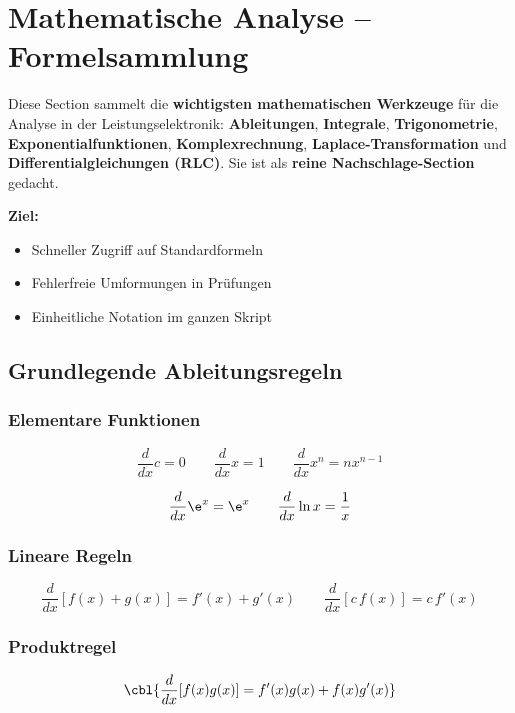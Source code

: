 \section{Mathematische Analyse -- Formelsammlung}

Diese Section sammelt die \textbf{wichtigsten mathematischen Werkzeuge}
für die Analyse in der Leistungselektronik:
\textbf{Ableitungen}, \textbf{Integrale}, \textbf{Trigonometrie},
\textbf{Exponentialfunktionen}, \textbf{Komplexrechnung},
\textbf{Laplace-Transformation} und \textbf{Differentialgleichungen (RLC)}.
Sie ist als \textbf{reine Nachschlage-Section} gedacht.

\smallskip

\textbf{Ziel:}
\begin{itemize}
    \item Schneller Zugriff auf Standardformeln
    \item Fehlerfreie Umformungen in Prüfungen
    \item Einheitliche Notation im ganzen Skript
\end{itemize}

\subsection{Grundlegende Ableitungsregeln}

\subsubsection{Elementare Funktionen}

\[
\frac{d}{dx} c = 0
\qquad
\frac{d}{dx} x = 1
\qquad
\frac{d}{dx} x^n = n x^{n-1}
\]

\[
\frac{d}{dx} \e^{x} = \e^{x}
\qquad
\frac{d}{dx} \ln x = \frac{1}{x}
\]

\subsubsection{Lineare Regeln}

\[
\frac{d}{dx} [f(x) + g(x)] = f'(x) + g'(x)
\qquad
\frac{d}{dx} [c \, f(x)] = c \, f'(x)
\]

\subsubsection{Produktregel}

\[
\cbl{\frac{d}{dx} [f(x) g(x)] = f'(x) g(x) + f(x) g'(x)}
\]

